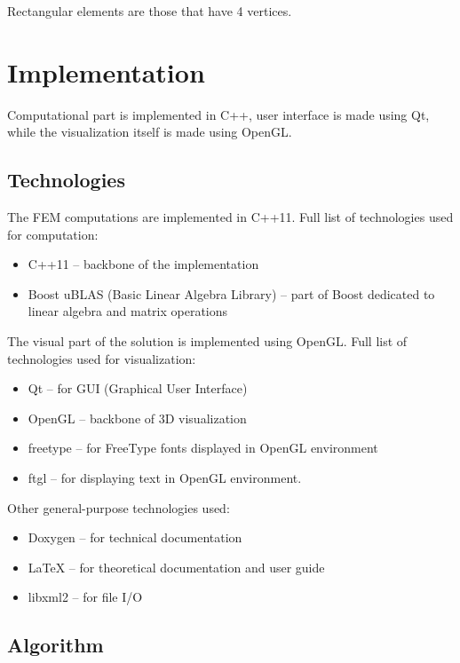 \documentclass[a4paper,12pt]{article}
\begin{document}
Rectangular elements are those that have 4 vertices.

\section{Implementation}

Computational part is implemented in C++, user interface is made using Qt, while the visualization itself is made using
OpenGL.

\subsection{Technologies}

The FEM computations are implemented in C++11. Full list of technologies used for computation:

\begin{itemize}
  \item C++11 -- backbone of the implementation
  \item Boost uBLAS (Basic Linear Algebra Library) -- part of Boost dedicated to linear algebra and matrix operations
\end{itemize}

The visual part of the solution is implemented using OpenGL. Full list of technologies used for visualization:

\begin{itemize}
  \item Qt -- for GUI (Graphical User Interface)
  \item OpenGL -- backbone of 3D visualization
  \item freetype -- for FreeType fonts displayed in OpenGL environment
  \item ftgl -- for displaying text in OpenGL environment.
\end{itemize}

Other general-purpose technologies used:

\begin{itemize}
  \item Doxygen -- for technical documentation
  \item LaTeX -- for theoretical documentation and user guide
  \item libxml2 -- for file I/O
\end{itemize}

\subsection{Algorithm}
\end{document}
